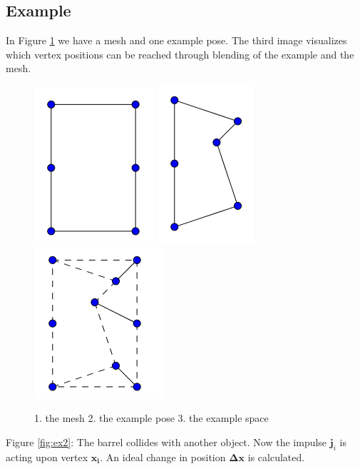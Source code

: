 \documentclass[
	11pt, 
	DIV10,
	a4paper, 
	oneside, 
	headings=normal, 
	captions=tableheading,
	final, 
	numbers=noenddot
]{scrartcl}
\begin{document}
\subsection{Example}
In Figure \ref{fig:ex1} we have a mesh and one example pose. The third image visualizes which vertex positions can be reached through blending of the example and the mesh.\\
\begin{figure}[tb]
	\centering
	\includegraphics[height=.3\linewidth]{images/ex1} 	
	\includegraphics[height=.31\linewidth]{images/ex2} 	
	\includegraphics[height=.31\linewidth]{images/ex5} 	
	\caption{\label{fig:ex1} 1. the mesh 2. the example pose 3. the example space}
\end{figure}
Figure \ref{fig:ex2}: The barrel collides with another object. Now the impulse $\bm j_i$ is acting upon vertex $\bm{x_i}$. An ideal change in position $\bm{\Delta x}$ is calculated.\\
\end{document}
